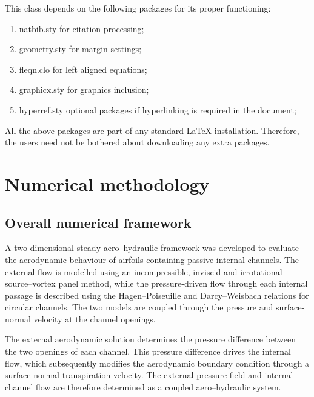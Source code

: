 \documentclass[a4paper,fleqn]{cas-dc}
\begin{document}
This class depends on the following packages
for its proper functioning:

\begin{enumerate}
	\itemsep=0pt
	\item {natbib.sty} for citation processing;
	\item {geometry.sty} for margin settings;
	\item {fleqn.clo} for left aligned equations;
	\item {graphicx.sty} for graphics inclusion;
	\item {hyperref.sty} optional packages if hyperlinking is
	required in the document;
\end{enumerate}  

All the above packages are part of any
standard \LaTeX{} installation.
Therefore, the users need not be
bothered about downloading any extra packages.

\section{Numerical methodology}
\label{sec:numerical_methodology}



\subsection{Overall numerical framework}
\label{subsec:overall_framework}

A two-dimensional steady aero--hydraulic framework was developed to
evaluate the aerodynamic behaviour of airfoils containing passive
internal channels. The external flow is modelled using an
incompressible, inviscid and irrotational source--vortex panel method,
while the pressure-driven flow through each internal passage is
described using the Hagen--Poiseuille and Darcy--Weisbach relations for
circular channels. The two models are coupled through the pressure and
surface-normal velocity at the channel openings.

The external aerodynamic solution determines the pressure difference
between the two openings of each channel. This pressure difference
drives the internal flow, which subsequently modifies the aerodynamic
boundary condition through a surface-normal transpiration velocity.
The external pressure field and internal channel flow are therefore
determined as a coupled aero--hydraulic system.
\end{document}
